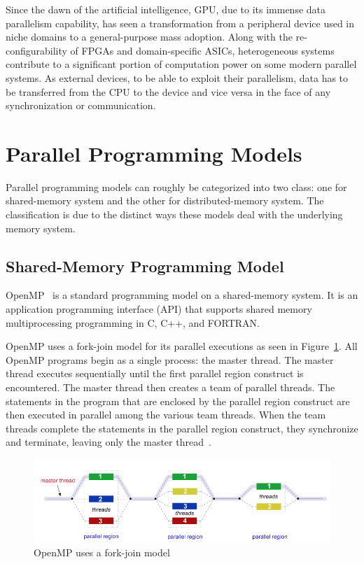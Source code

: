 Since the dawn of the artificial intelligence, GPU, due to its immense data 
parallelism capability, has seen a transformation from a peripheral device used 
in niche domains to a general-purpose mass adoption. Along with the 
re-configurability of FPGAs and domain-specific ASICs, heterogeneous systems 
contribute to a significant portion of computation power on some modern parallel 
systems. As external devices, to be able to exploit their parallelism, data has 
to be transferred from the CPU to the device and vice versa in the face of any 
synchronization or communication. 

\section{Parallel Programming Models}
\label{sec:ppm}
Parallel programming models can roughly be categorized into two class: one for 
shared-memory system and the other for distributed-memory system. The 
classification is due to the distinct ways these models deal with the underlying 
memory system.

\subsection{Shared-Memory Programming Model}
OpenMP~\cite{openmp, OpenMP4.0} is a standard programming model on a 
shared-memory system. It is an application programming interface (API) that 
supports shared memory multiprocessing programming in C, C++, and FORTRAN.

OpenMP uses a fork-join model for its parallel executions as seen in 
Figure~\ref{fig:fork-join}.
All OpenMP programs begin as a single process: the master thread. The master 
thread executes sequentially until the first parallel region construct is 
encountered. The master thread then creates a team of parallel threads.
The statements in the program that are enclosed by the parallel region construct 
are then executed in parallel among the various team threads. When the team 
threads complete the statements in the parallel region construct, they 
synchronize and terminate, leaving only the master thread~\cite{llnl_openmp}.
\begin{figure}[H]
    \centerline{\includegraphics[scale=0.50]{background/figs/fork_join.png}}
    \caption{OpenMP uses a fork-join model}
    \label{fig:fork-join}
\end{figure}

